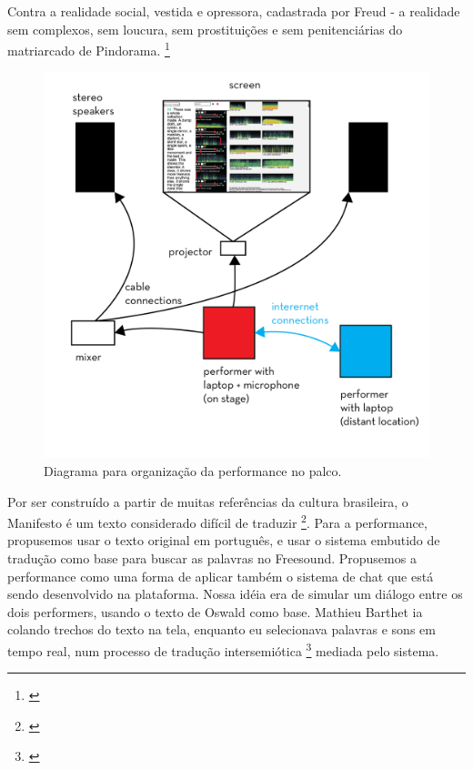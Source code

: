 \begin{citacao}
Contra a realidade social, vestida e opressora, cadastrada por Freud - a realidade sem complexos, sem loucura, sem prostituições e sem penitenciárias do matriarcado de Pindorama. \footnote{\cite{Andrade1928}}
\end{citacao}

\begin{figure}

\includegraphics[width=1\linewidth]{pictures/cap4/diagrama-cannibal}
\caption{Diagrama para organização da performance no palco.}
\label{diagram}
\end{figure}

Por ser construído a partir de muitas referências da cultura brasileira, o Manifesto é um texto considerado difícil de traduzir \footnote{\cite{Lesli-1991}}. Para a performance, propusemos usar o texto original em português, e usar o sistema embutido de tradução como base para buscar as palavras no Freesound. Propusemos a performance como uma forma de aplicar também o sistema de chat que está sendo desenvolvido na plataforma. Nossa idéia era de simular um diálogo entre os dois performers, usando o texto de Oswald como base. Mathieu Barthet ia colando trechos do texto na tela, enquanto eu selecionava palavras e sons em tempo real, num processo de tradução intersemiótica \footnote{\cite{JulioPlaza1969}} mediada pelo sistema. 

